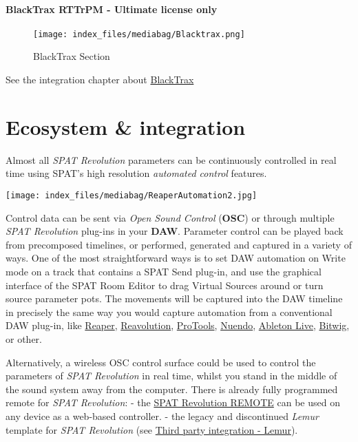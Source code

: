 \documentclass[
  letterpaper,
  DIV=11,
  numbers=noendperiod]{scrreport}
\begin{document}
\hypertarget{blacktrax-rttrpm---ultimate-license-only}{%
\subsection{BlackTrax RTTrPM - Ultimate license
only}\label{blacktrax-rttrpm---ultimate-license-only}}

\begin{figure}

{\centering \texttt{[image: index\_files/mediabag/Blacktrax.png]}

}

\caption{BlackTrax Section}

\end{figure}

See the integration chapter about
\href{ThirdParty_BlackTrax.md}{BlackTrax}

\part{Ecosystem \& integration}

Almost all \emph{SPAT Revolution} parameters can be continuously
controlled in real time using SPAT's high resolution \emph{automated
control} features.

\texttt{[image: index\_files/mediabag/ReaperAutomation2.jpg]}

Control data can be sent via \emph{Open Sound Control} (\textbf{OSC}) or
through multiple \emph{SPAT Revolution} plug-ins in your \textbf{DAW}.
Parameter control can be played back from precomposed timelines, or
performed, generated and captured in a variety of ways. One of the most
straightforward ways is to set DAW automation on Write mode on a track
that contains a SPAT Send plug-in, and use the graphical interface of
the SPAT Room Editor to drag Virtual Sources around or turn source
parameter pots. The movements will be captured into the DAW timeline in
precisely the same way you would capture automation from a conventional
DAW plug-in, like \href{Third_Party_Cockos_Reaper.md}{Reaper},
\href{Third_Party_ReaVolution.md}{Reavolution},
\href{Third_Party_ProTools.md}{ProTools},
\href{Third_Party_AbletonLive.md}{Nuendo},
\href{Third_Party_Nuendo.md}{Ableton Live},
\href{Third_Party_Bitwig_Studio.md}{Bitwig}, or other.

Alternatively, a wireless OSC control surface could be used to control
the parameters of \emph{SPAT Revolution} in real time, whilst you stand
in the middle of the sound system away from the computer. There is
already fully programmed remote for \emph{SPAT Revolution}: - the
\href{ThirdParty_SPATRevolution_Remote}{SPAT Revolution REMOTE} can be
used on any device as a web-based controller. - the legacy and
discontinued \emph{Lemur} template for \emph{SPAT Revolution} (see
\href{ThirdParty_Tablet_Remote.md}{Third party integration - Lemur}).
\end{document}
